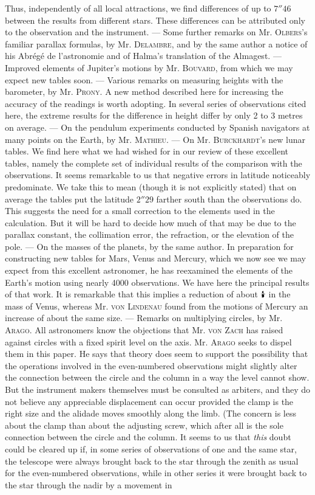 Thus, independently of all local attractions, we find differences of up to $7''46$ between the results from different stars. These differences can be attributed only to the observation and the instrument. --- Some further remarks on Mr. \textsc{Olbers}'s familiar parallax formulas, by Mr. \textsc{Delambre}, and by the same author a notice of his Abrégé de l'astronomie and of Halma's translation of the Almagest. --- Improved elements of Jupiter's motions by Mr. \textsc{Bouvard}, from which we may expect new tables soon. --- Various remarks on measuring heights with the barometer, by Mr. \textsc{Prony}. A new method described here for increasing the accuracy of the readings is worth adopting. In several series of observations cited here, the extreme results for the difference in height differ by only 2 to 3 metres on average. --- On the pendulum experiments conducted by Spanish navigators at many points on the Earth, by Mr. \textsc{Mathieu}. --- On Mr. \textsc{Burckhardt}'s new lunar tables. We find here what we had wished for in our review of these excellent tables, namely the complete set of individual results of the comparison with the observations. It seems remarkable to us that negative errors in latitude noticeably predominate. We take this to mean (though it is not explicitly stated) that on average the tables put the latitude $2''29$ farther south than the observations do. This suggests the need for a small correction to the elements used in the calculation. But it will be hard to decide how much of that may be due to the parallax constant, the collimation error, the refraction, or the elevation of the pole. --- On the masses of the planets, by the same author. In preparation for constructing new tables for Mars, Venus and Mercury, which we now see we may expect from this excellent astronomer, he has reexamined the elements of the Earth's motion using nearly 4000 observations. We have here the principal results of that work. It is remarkable that this implies a reduction of about $\ObservedVenusFraction$ in the mass of Venus, whereas Mr. \textsc{von Lindenau} found from the motions of Mercury an increase of about the same size. --- Remarks on multiplying circles, by Mr. \textsc{Arago}. All astronomers know the objections that Mr. \textsc{von Zach} has raised against circles with a fixed spirit level on the axis. Mr. \textsc{Arago} seeks to dispel them in this paper. He says that theory does seem to support the possibility that the operations involved in the even-numbered observations might slightly alter the connection between the circle and the column in a way the level cannot show. But the instrument makers themselves must be consulted as arbiters, and they do not believe any appreciable displacement can occur provided the clamp is the right size and the alidade moves smoothly along the limb. (The concern is less about the clamp than about the adjusting screw, which after all is the sole connection between the circle and the column. It seems to us that \emph{this} doubt could be cleared up if, in some series of observations of one and the same star, the telescope were always brought back to the star through the zenith as usual for the even-numbered observations, while in other series it were brought back to the star through the nadir by a movement in 